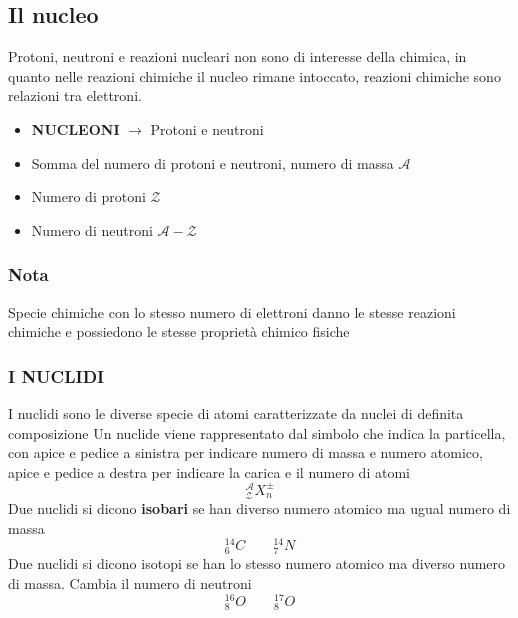 \documentclass{article}
\begin{document}
\subsection{Il nucleo}
Protoni, neutroni e reazioni nucleari non sono di interesse della chimica, in quanto nelle reazioni chimiche il nucleo rimane intoccato, reazioni chimiche sono relazioni tra elettroni. 
\begin{itemize}
    \item \textbf{NUCLEONI} $\rightarrow$ Protoni e neutroni
    \item Somma del numero di protoni e neutroni, numero di massa $\mathcal{A}$
    \item Numero di protoni $\mathcal{Z}$
    \item Numero di neutroni $\mathcal{A-Z}$
\end{itemize}
\subsubsection*{Nota}
Specie chimiche con lo stesso numero di elettroni danno le stesse reazioni chimiche e possiedono le stesse proprietà chimico fisiche
\subsubsection{I NUCLIDI}
I nuclidi sono le diverse specie di atomi caratterizzate da nuclei di definita composizione Un nuclide viene rappresentato dal simbolo che indica la particella, con apice e pedice a sinistra per indicare numero di massa e numero atomico, apice e pedice a destra per indicare la carica e il numero di atomi
\[
^\mathcal{A}_\mathcal{Z}X^\pm _n
\]
Due nuclidi si dicono \textbf{isobari} se han diverso numero atomico ma ugual numero di massa
\[
^{14}_6C \qquad  ^{14}_7N
\]
Due nuclidi si dicono isotopi se han lo stesso numero atomico ma diverso numero di massa. Cambia il numero di neutroni
\[
^{16}_8O \qquad ^{17}_8O
\]
\end{document}
